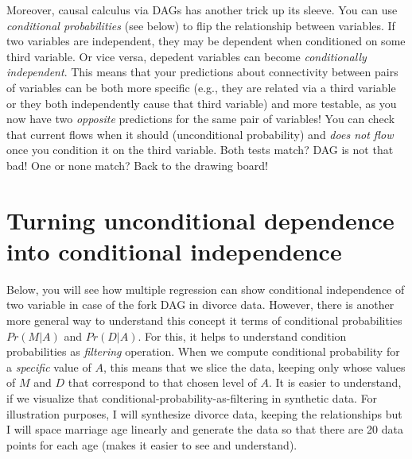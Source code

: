 \documentclass[
]{book}
\begin{document}
Moreover, causal calculus via DAGs has another trick up its sleeve. You can use \emph{conditional probabilities} (see below) to flip the relationship between variables. If two variables are independent, they may be dependent when conditioned on some third variable. Or vice versa, depedent variables can become \emph{conditionally independent}. This means that your predictions about connectivity between pairs of variables can be both more specific (e.g., they are related via a third variable or they both independently cause that third variable) and more testable, as you now have two \emph{opposite} predictions for the same pair of variables! You can check that current flows when it should (unconditional probability) and \emph{does not flow} once you condition it on the third variable. Both tests match? DAG is not that bad! One or none match? Back to the drawing board!

\hypertarget{turning-unconditional-dependence-into-conditional-independence}{%
\section{Turning unconditional dependence into conditional independence}\label{turning-unconditional-dependence-into-conditional-independence}}

Below, you will see how multiple regression can show conditional independence of two variable in case of the fork DAG in divorce data. However, there is another more general way to understand this concept it terms of conditional probabilities \(Pr(M|A)\) and \(Pr(D|A)\). For this, it helps to understand condition probabilities as \emph{filtering} operation. When we compute conditional probability for a \emph{specific} value of \(A\), this means that we slice the data, keeping only whose values of \(M\) and \(D\) that correspond to that chosen level of \(A\). It is easier to understand, if we visualize that conditional-probability-as-filtering in synthetic data. For illustration purposes, I will synthesize divorce data, keeping the relationships but I will space marriage age linearly and generate the data so that there are 20 data points for each age (makes it easier to see and understand).
\end{document}
